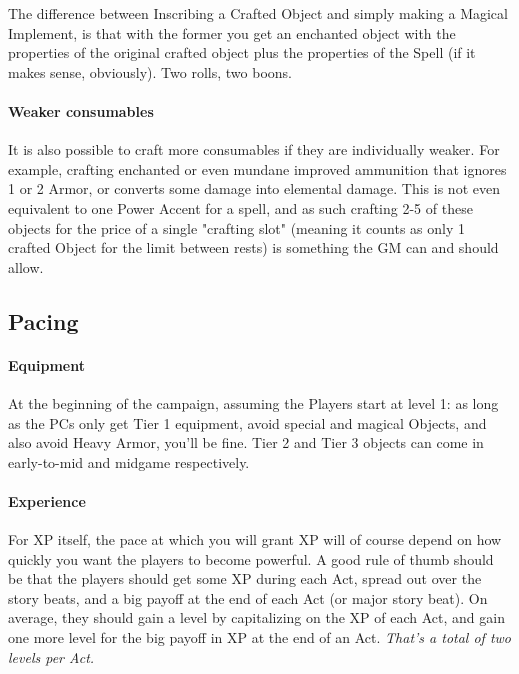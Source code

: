 The difference between Inscribing a Crafted Object and simply making a Magical Implement, is that with the former you get an enchanted object with the properties of the original crafted object plus the properties of the Spell (if it makes sense, obviously). Two rolls, two boons.


\paragraph{Weaker consumables}

\label{weaker_consumables}

It is also possible to craft more consumables if they are individually weaker. For example, crafting enchanted or even mundane improved ammunition that ignores 1 or 2 Armor, or converts some damage into elemental damage. This is not even equivalent to one Power Accent for a spell, and as such crafting 2-5 of these objects for the price of a single "crafting slot" (meaning it counts as only 1 crafted Object for the limit between rests) is something the GM can and should allow.


\subsection{Pacing}

\label{leveling_balancing}

\paragraph{Equipment}

At the beginning of the campaign, assuming the Players start at level 1: as long as the PCs only get Tier 1 equipment, avoid special and magical Objects, and also avoid Heavy Armor, you'll be fine. Tier 2 and Tier 3 objects can come in early-to-mid and midgame respectively.


\paragraph{Experience}

For XP itself, the pace at which you will grant XP will of course depend on how quickly you want the players to become powerful. A good rule of thumb should be that the players should get some XP during each Act, spread out over the story beats, and a big payoff at the end of each Act (or major story beat). On average, they should gain a level by capitalizing on the XP of each Act, and gain one more level for the big payoff in XP at the end of an Act. \textit{That's a total of two levels per Act.}

